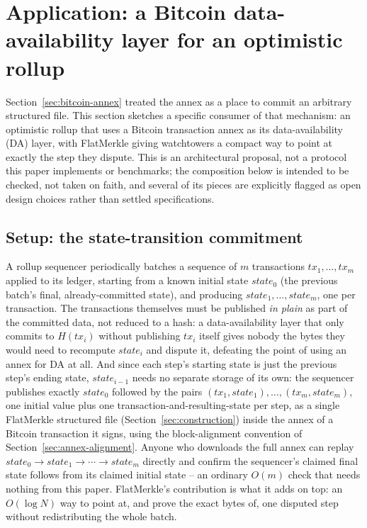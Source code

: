 \section{Application: a Bitcoin data-availability layer for an optimistic rollup}
\label{sec:rollup-da}

Section~\ref{sec:bitcoin-annex} treated the annex as a place to commit an
arbitrary structured file. This section sketches a specific consumer of
that mechanism: an optimistic rollup that uses a Bitcoin transaction annex
as its data-availability (DA) layer, with FlatMerkle giving watchtowers a
compact way to point at exactly the step they dispute. This is an
architectural proposal, not a protocol this paper implements or
benchmarks; the composition below is intended to be checked, not taken on
faith, and several of its pieces are explicitly flagged as open design
choices rather than settled specifications.

\subsection{Setup: the state-transition commitment}
\label{sec:rollup-setup}

A rollup sequencer periodically batches a sequence of $m$ transactions
$\mathit{tx}_1, \dots, \mathit{tx}_m$ applied to its ledger, starting from a
known initial state $\mathit{state}_0$ (the previous batch's final,
already-committed state), and producing $\mathit{state}_1, \dots,
\mathit{state}_m$, one per transaction. The transactions themselves must be
published \emph{in plain} as part of the committed data, not reduced to a
hash: a data-availability layer that only commits to $H(\mathit{tx}_i)$
without publishing $\mathit{tx}_i$ itself gives nobody the bytes they would
need to recompute $\mathit{state}_i$ and dispute it, defeating the point of
using an annex for DA at all. And since each step's starting state is just
the previous step's ending state, $\mathit{state}_{i-1}$ needs no separate
storage of its own: the sequencer publishes exactly $\mathit{state}_0$
followed by the pairs $(\mathit{tx}_1, \mathit{state}_1), \dots,
(\mathit{tx}_m, \mathit{state}_m)$, one initial value plus one
transaction-and-resulting-state per step, as a single FlatMerkle structured
file (Section~\ref{sec:construction}) inside the annex of a Bitcoin
transaction it signs, using the block-alignment convention of
Section~\ref{sec:annex-alignment}. Anyone who downloads the full annex can
replay $\mathit{state}_0 \to \mathit{state}_1 \to \cdots \to \mathit{state}_m$
directly and confirm the sequencer's claimed final state follows from its
claimed initial state -- an ordinary $O(m)$ check that needs nothing from
this paper. FlatMerkle's contribution is what it adds on top: an
$O(\log N)$ way to point at, and prove the exact bytes of, one disputed
step without redistributing the whole batch.


